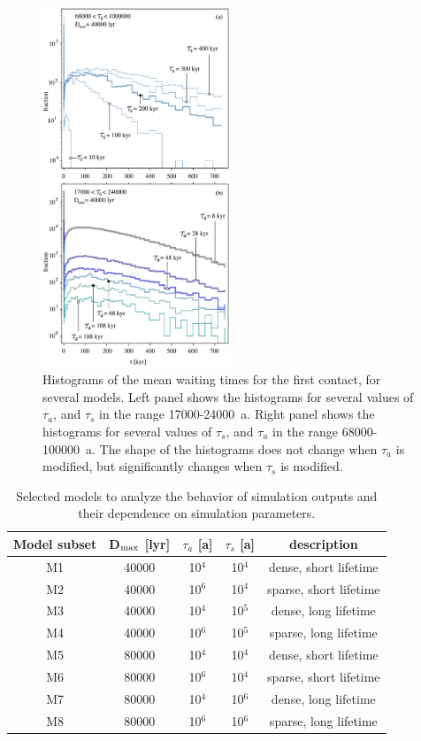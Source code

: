 \documentclass[crop]{CSLB}
\begin{document}
\begin{figure}
   \centering
   \includegraphics[width=0.5\textwidth]{F_waiting_for_1C.pdf}
   \caption{
Histograms of the mean waiting times for the first contact, for
several models.
%
Left panel shows the histograms for several values of $\tau_a$, and
$\tau_s$ in the range 17000-24000~a.
%
Right panel shows the histograms for several values of $\tau_s$, and
$\tau_a$ in the range 68000-100000~a.
%
The shape of the histograms does not change when $\tau_a$ is
modified, but significantly changes when $\tau_s$ is modified. 
%
   }
   \label{F_waiting_for_1C}
\end{figure}

\setlength{\tabcolsep}{10pt}
\begin{table}
\centering
\begin{tabular}{ccccc}
\hline
Model subset& D$_{\rm max}$ [lyr] & $\tau_a$ [a] & $\tau_s$ [a]&description\\
\hline
M1 & 40000 & 10$^4$   & 10$^4$  & dense, short lifetime\\
M2 & 40000 & 10$^6$   & 10$^4$  & sparse, short lifetime\\
M3 & 40000 & 10$^4$   & 10$^5$  & dense, long lifetime \\
M4 & 40000 & 10$^6$   & 10$^5$  & sparse, long lifetime\\
%                               
M5 & 80000 & 10$^4$   & 10$^4$  & dense, short lifetime\\
M6 & 80000 & 10$^6$   & 10$^4$  & sparse, short lifetime\\
M7 & 80000 & 10$^4$   & 10$^6$  & dense, long lifetime \\
M8 & 80000 & 10$^6$   & 10$^6$  & sparse, long lifetime\\
%
\hline
\end{tabular}
\caption{Selected models to analyze the behavior of simulation outputs
   and their dependence on simulation parameters.}
\label{T_selected_models}
\end{table}
\end{document}
